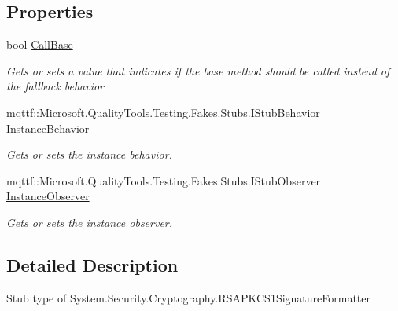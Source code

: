 \subsection*{Properties}
\begin{DoxyCompactItemize}
\item 
bool \hyperlink{class_system_1_1_security_1_1_cryptography_1_1_fakes_1_1_stub_r_s_a_p_k_c_s1_signature_formatter_aab7167601b0cad1e73d4c8126dfe27d6}{Call\-Base}
\begin{DoxyCompactList}\small\item\em Gets or sets a value that indicates if the base method should be called instead of the fallback behavior\end{DoxyCompactList}\item 
mqttf\-::\-Microsoft.\-Quality\-Tools.\-Testing.\-Fakes.\-Stubs.\-I\-Stub\-Behavior \hyperlink{class_system_1_1_security_1_1_cryptography_1_1_fakes_1_1_stub_r_s_a_p_k_c_s1_signature_formatter_adb0a7b1f9f6035f35967d0c2746918b1}{Instance\-Behavior}
\begin{DoxyCompactList}\small\item\em Gets or sets the instance behavior.\end{DoxyCompactList}\item 
mqttf\-::\-Microsoft.\-Quality\-Tools.\-Testing.\-Fakes.\-Stubs.\-I\-Stub\-Observer \hyperlink{class_system_1_1_security_1_1_cryptography_1_1_fakes_1_1_stub_r_s_a_p_k_c_s1_signature_formatter_a665f92f8f9a099b99c0ec08ed786b5ba}{Instance\-Observer}
\begin{DoxyCompactList}\small\item\em Gets or sets the instance observer.\end{DoxyCompactList}\end{DoxyCompactItemize}


\subsection{Detailed Description}
Stub type of System.\-Security.\-Cryptography.\-R\-S\-A\-P\-K\-C\-S1\-Signature\-Formatter




